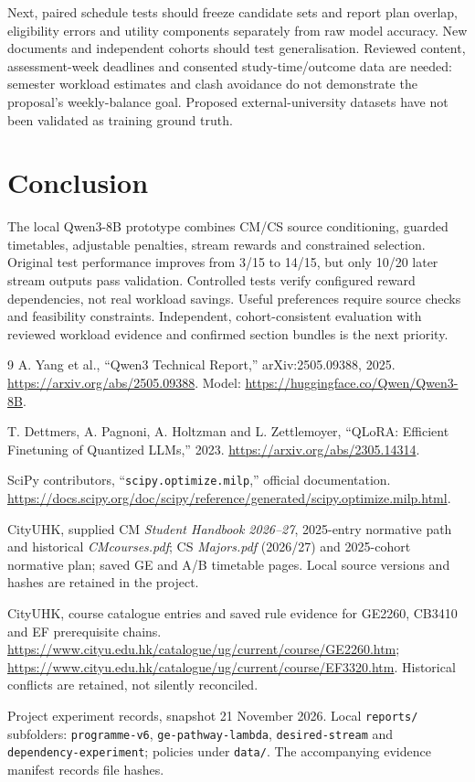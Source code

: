 \documentclass{article}
\begin{document}
Next, paired schedule tests should freeze candidate sets and report plan overlap, eligibility errors and utility components separately from raw model accuracy. New documents and independent cohorts should test generalisation. Reviewed content, assessment-week deadlines and consented study-time/outcome data are needed: semester workload estimates and clash avoidance do not demonstrate the proposal's weekly-balance goal. Proposed external-university datasets have not been validated as training ground truth.

\section{Conclusion}
The local Qwen3-8B prototype combines CM/CS source conditioning, guarded timetables, adjustable penalties, stream rewards and constrained selection. Original test performance improves from 3/15 to 14/15, but only 10/20 later stream outputs pass validation. Controlled tests verify configured reward dependencies, not real workload savings. Useful preferences require source checks and feasibility constraints. Independent, cohort-consistent evaluation with reviewed workload evidence and confirmed section bundles is the next priority.

\begin{thebibliography}{9}
\small
{}
A. Yang et al., ``Qwen3 Technical Report,'' arXiv:2505.09388, 2025.
\url{https://arxiv.org/abs/2505.09388}. Model: \url{https://huggingface.co/Qwen/Qwen3-8B}.

T. Dettmers, A. Pagnoni, A. Holtzman and L. Zettlemoyer, ``QLoRA: Efficient Finetuning of Quantized LLMs,'' 2023. \url{https://arxiv.org/abs/2305.14314}.

SciPy contributors, ``\texttt{scipy.optimize.milp},'' official documentation.
\url{https://docs.scipy.org/doc/scipy/reference/generated/scipy.optimize.milp.html}.

CityUHK, supplied CM \emph{Student Handbook 2026--27}, 2025-entry normative path and historical \emph{CMcourses.pdf}; CS \emph{Majors.pdf} (2026/27) and 2025-cohort normative plan; saved GE and A/B timetable pages. Local source versions and hashes are retained in the project.

CityUHK, course catalogue entries and saved rule evidence for GE2260, CB3410 and EF prerequisite chains. \url{https://www.cityu.edu.hk/catalogue/ug/current/course/GE2260.htm}; \url{https://www.cityu.edu.hk/catalogue/ug/current/course/EF3320.htm}. Historical conflicts are retained, not silently reconciled.

Project experiment records, snapshot 21 November 2026. Local \texttt{reports/} subfolders: \texttt{programme-v6}, \texttt{ge-pathway-lambda}, \texttt{desired-stream} and \texttt{dependency-experiment}; policies under \texttt{data/}. The accompanying evidence manifest records file hashes.
\end{thebibliography}
\end{document}
